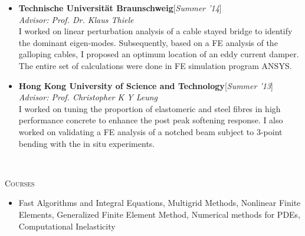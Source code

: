 \documentclass[10pt]{article}
\begin{document}
\begin{minipage}[t]{0.85\linewidth}
\vspace{-1.5em}
\begin{itemize}[itemsep=1pt, label={}]
	\item {\bf Technische Universit\"{a}t Braunschweig}\hfill [\textsl{Summer '14}]\\
	\textsl{Advisor: Prof. Dr. Klaus Thiele}\\
	I worked on linear perturbation analysis of a cable stayed bridge to identify the dominant eigen-modes. Subsequently, based on a FE analysis of the galloping cables, I proposed an optimum location of an eddy current damper. The entire set of calculations were done in FE simulation program ANSYS. 
	\item {\bf Hong Kong University of Science and Technology}\hfill [\textsl{Summer '13}]\\
	\textsl{Advisor: Prof. Christopher K Y Leung}\\
	I worked on tuning the proportion of elastomeric and steel fibres in high performance concrete to enhance the post peak softening response. I also worked on validating a FE analysis of a notched beam subject to 3-point bending with the in situ experiments.
\end{itemize}
\end{minipage}\\[4mm]
\begin{minipage}{0.15\linewidth}
	\textsc{Courses}
\end{minipage}\hfill
\begin{minipage}[t]{0.85\linewidth}
	\vspace{-1em}
	\begin{itemize}[itemsep=-1pt, label={}]
	\item Fast Algorithms and Integral Equations, Multigrid Methods, Nonlinear Finite Elements, Generalized Finite Element Method, Numerical methods for PDEs, Computational Inelasticity
	\end{itemize}
\end{minipage}
\end{document}
